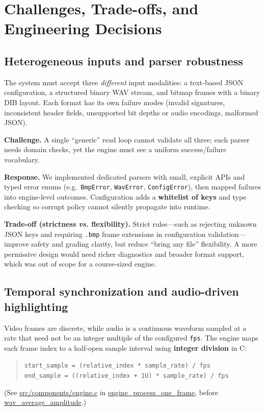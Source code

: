 \section{Challenges, Trade-offs, and Engineering Decisions}

\subsection{Heterogeneous inputs and parser robustness}
The system must accept three \emph{different} input modalities: a text-based JSON configuration, a structured binary WAV stream, and bitmap frames with a binary DIB layout. Each format has its own failure modes (invalid signatures, inconsistent header fields, unsupported bit depths or audio encodings, malformed JSON).

\textbf{Challenge.} A single ``generic'' read loop cannot validate all three; each parser needs domain checks, yet the engine must see a uniform success/failure vocabulary.

\textbf{Response.} We implemented dedicated parsers with small, explicit APIs and typed error enums (e.g.\ \texttt{BmpError}, \texttt{WavError}, \texttt{ConfigError}), then mapped failures into engine-level outcomes. Configuration adds a \textbf{whitelist of keys} and type checking so corrupt policy cannot silently propagate into runtime.

\textbf{Trade-off (strictness \emph{vs.} flexibility).} Strict rules—such as rejecting unknown JSON keys and requiring \texttt{.bmp} frame extensions in configuration validation—improve safety and grading clarity, but reduce ``bring any file'' flexibility. A more permissive design would need richer diagnostics and broader format support, which was out of scope for a course-sized engine.

\subsection{Temporal synchronization and audio-driven highlighting}
Video frames are discrete, while audio is a continuous waveform sampled at a rate that need not be an integer multiple of the configured \texttt{fps}. The engine maps each frame index to a half-open sample interval using \textbf{integer division} in C:
\begin{quote}
\small
\texttt{start\_sample = (relative\_index * sample\_rate) / fps}\\
\texttt{end\_sample = ((relative\_index + 1U) * sample\_rate) / fps}
\end{quote}
\noindent (See \url{src/components/engine.c} in \url{engine_process_one_frame}, before \url{wav_average_amplitude}.)

